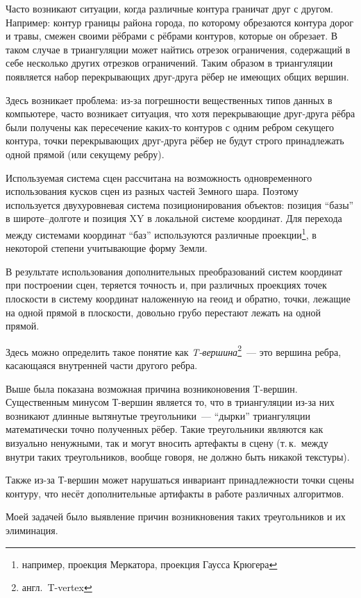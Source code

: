 \documentclass[a4paper,10pt,titlepage]{report}
\begin{document}
Часто возникают ситуации, когда различные контура граничат друг с другом.
Например: контур границы района города, по которому обрезаются контура дорог и травы,
смежен своими рёбрами с рёбрами контуров, которые он обрезает.
В таком случае в триангуляции может найтись отрезок ограничения,
содержащий в себе несколько других отрезков ограничений.
Таким образом в триангуляции появляется набор перекрывающих друг-друга рёбер не имеющих общих вершин.

Здесь возникает проблема: из-за погрешности вещественных типов данных в компьютере,
часто возникает ситуация, что хотя перекрывающие друг-друга рёбра были получены как пересечение
каких-то контуров с одним ребром секущего контура, 
точки перекрывающих друг-друга рёбер не будут строго принадлежать одной прямой (или секущему ребру).

Используемая система сцен рассчитана на возможность одновременного использования кусков сцен из разных частей Земного шара.
Поэтому используется двухуровневая система позиционирования объектов: 
позиция ``базы'' в широте--долготе и позиция XY в локальной системе координат.
Для перехода между системами координат ``баз'' используются различные проекции\footnote{например, проекция Меркатора, проекция Гаусса Крюгера}, в некоторой степени учитывающие форму Земли.

В результате использования дополнительных преобразований систем координат при построении сцен, 
теряется точность 
и, при различных проекциях точек плоскости в систему координат наложенную на геоид и обратно,
точки, лежащие на одной прямой в плоскости, довольно грубо перестают лежать на одной прямой.

Здесь можно определить такое понятие как \textit{T-вершина}\footnote{англ.~T-vertex}~--- 
это вершина ребра, касающаяся внутренней части другого ребра.

Выше была показана возможная причина возниконовения T-вершин.
Существенным минусом Т-вершин является то, 
что в триангуляции из-за них возникают длинные вытянутые треугольники~--- 
``дырки'' триангуляции математически точно полученных рёбер.
Такие треугольники являются как визуально ненужными, 
так и могут вносить артефакты в сцену
(т.\,к.~между внутри таких треугольников, вообще говоря, не должно быть никакой текстуры).

Также из-за Т-вершин может нарушаться инвариант принадлежности точки сцены контуру,
что несёт дополнительные артифакты в работе различных алгоритмов.

Моей задачей было выявление причин возникновения таких треугольников и их элиминация.
\end{document}
